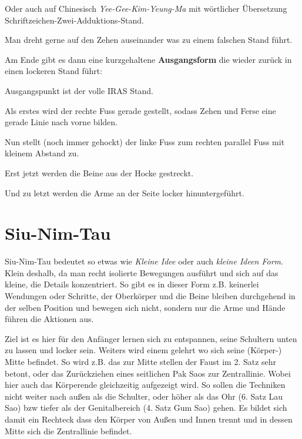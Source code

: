 	
	\begin{WTCommonBegriff}
		Oder auch auf Chinesisch \textit{Yee-Gee-Kim-Yeung-Ma} mit w\"ortlicher \"Ubersetzung Schriftzeichen-Zwei-Adduktions-Stand.
	\end{WTCommonBegriff}
	
\begin{WTCommonNoob}
	Man dreht gerne auf den Zehen auseinander was zu einem falschen Stand f\"uhrt.
\end{WTCommonNoob}




Am Ende gibt es dann eine kurzgehaltene \textbf{Ausgangsform} die wieder zur\"uck in einen lockeren Stand f\"uhrt:

\begin{WTalphenum}
	\item Ausgangspunkt ist der volle IRAS Stand.
	\item Als erstes wird der rechte Fuss gerade gestellt, sodass Zehen und Ferse eine gerade Linie nach vorne bilden.
	\item Nun stellt (noch immer gehockt) der linke Fuss zum rechten parallel Fuss mit kleinem Abstand zu.
	\item Erst jetzt werden die Beine aus der Hocke gestreckt.
	\item Und zu letzt werden die Arme an der Seite locker hinuntergef\"uhrt.
\end{WTalphenum}


\section{Siu-Nim-Tau}

Siu-Nim-Tau bedeutet so etwas wie \textit{Kleine Idee} oder auch \textit{kleine Ideen Form}. Klein deshalb, da man recht isolierte Bewegungen ausf\"uhrt und sich auf das kleine, die Details konzentriert. So gibt es in dieser Form z.B. keinerlei Wendungen oder Schritte, der Oberk\"orper und die Beine bleiben durchgehend in der selben Position und bewegen sich nicht, sondern nur die Arme und H\"ande f\"uhren die Aktionen aus.

Ziel ist es hier f\"ur den Anf\"anger lernen sich zu entspannen, seine Schultern unten zu lassen und locker sein. Weiters wird einem gelehrt wo sich seine (K\"orper-) Mitte befindet. So wird z.B. das zur Mitte stellen der Faust im 2. Satz sehr betont, oder das Zur\"uckziehen eines seitlichen Pak Saos zur Zentrallinie. Wobei hier auch das K\"orperende gleichzeitig aufgezeigt wird. So sollen die Techniken nicht weiter nach au{\ss}en als die Schulter, oder h\"oher als das Ohr (6. Satz Lau Sao) bzw tiefer als der Genitalbereich (4. Satz Gum Sao) gehen. Es bildet sich damit ein Rechteck dass den K\"orper von Au{\ss}en und Innen trennt und in dessen Mitte sich die Zentrallinie befindet.

